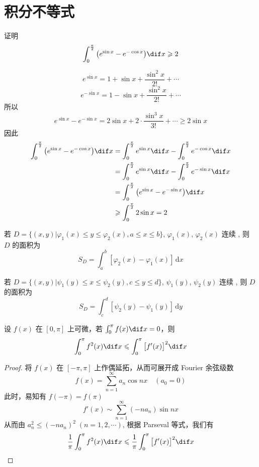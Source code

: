 \documentclass[color=green,titlestyle=hang]{elegantbook}%
\begin{document}
\section{积分不等式}

\begin{example}
证明\[\int_0^{\frac{\pi}{2}}\big(e^{\sin x}-e^{-\cos x}\big)\dif x\geqslant2\]
\end{example}\begin{newproof}
\[e^{\sin x}=1+\sin x+\frac{\sin^2x}{2!}+\cdots\]
\[e^{-\sin x}=1-\sin x+\frac{\sin^2x}{2!}+\cdots\]
所以\[e^{\sin x}-e^{-\sin x}=2\sin x+2\cdot\frac{\sin^3x}{3!}+\cdots\geqslant2\sin x\]
因此
\begin{align*}
\int_0^{\frac{\pi}{2}}\big(e^{\sin x}-e^{-\cos x}\big)\dif x
&=\int_0^{\frac{\pi}{2}}e^{\sin x}\dif x-\int_0^{\frac{\pi}{2}}e^{-\cos x}\dif x\\
&=\int_0^{\frac{\pi}{2}}e^{\sin x}\dif x-\int_0^{\frac{\pi}{2}}e^{-\sin x}\dif x\\
&=\int_0^{\frac{\pi}{2}}\big(e^{\sin x}-e^{-\sin x}\big)\dif x\\
&\geqslant\int_0^{\frac{\pi}{2}}2\sin x=2	
\end{align*}	
\end{newproof}

\begin{newthem}
若 $D=\{(x,y)|\varphi_1(x)\leqslant y\leqslant\varphi_2(x),a\leqslant x\leqslant b\}$, $\varphi_1(x)$, $\varphi_2(x)$ 连续 , 则 $D$ 的面积为\begin{equation*}S_D=\int_{a}^{b}\left[\varphi_2(x)-\varphi_1(x)\right]\,\mathrm{d}x\end{equation*}	
\end{newthem}

\begin{newthem}
若 $D=\{(x,y)|\psi_1(y)\leqslant x\leqslant\psi_2(y),c\leqslant y\leqslant d\}$, $\psi_1(y)$, $\psi_2(y)$  连续 , 则 $D$ 的面积为\begin{equation*}S_D=\int_{c}^{d}\left[\psi_2(y)-\psi_1(y)\right]\,\mathrm{d}y\end{equation*}	
\end{newthem}

\begin{example}
设 $f(x)$ 在 $[0,\pi]$ 上可微，若 $\int_0^\pi f(x)\dif x=0$，则
\[\int_0^\pi f^2(x)\dif x\leqslant\int_0^\pi\big[f'(x)\big]^2\dif x\]
\end{example}\begin{proof}
将 $f(x)$ 在 $[-\pi,\pi]$ 上作偶延拓，从而可展开成 Fourier 余弦级数
\[f(x)=\sum_{n=1}^{\infty}a_n\cos nx\quad(a_0=0)\]
此时，易知有 $f(-\pi)=f(\pi)$
\[f'(x)\sim\sum_{n=1}^{\infty}(-na_n)\sin nx\]
从而由 $a_n^2\leqslant(-na_n)^2\;(n=1,2,\cdots)$, 根据 Parseval 等式，我们有
\[\frac{1}{\pi}\int_0^\pi f^2(x)\dif x\leqslant\frac{1}{\pi}\int_0^\pi\big[f'(x)\big]^2\dif x\]
\end{proof}
\end{document}
